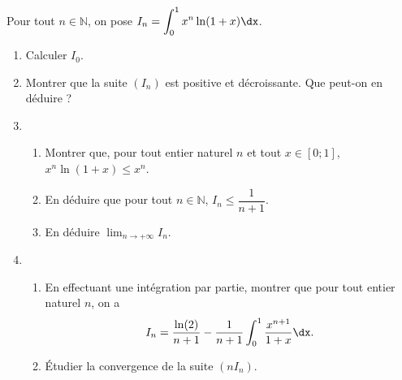 \documentclass[11pt,fleqn, openany]{book} %
\begin{document}
\begin{exercise}[topic=int04]Pour tout $n \in\mathbb{N}$, on pose $I_n=\displaystyle\int_0^1x^n \ln(1+x)\dx$.
\begin{enumerate}
\item Calculer $I_0$.
\item Montrer que la suite $(I_n)$ est positive et décroissante. Que peut-on en déduire ?
\item \begin{enumerate}
\item Montrer que, pour tout entier naturel $n$ et tout $x\in [0;1]$, $x^n \ln(1+x) \leqslant x^n$.
\item En déduire que pour tout $n \in \mathbb{N}$, $I_n \leqslant \dfrac{1}{n+1}$.
\item En déduire $\displaystyle\lim_{n \to+\infty}I_n$.
\end{enumerate}
\item \begin{enumerate}
\item En effectuant une intégration par partie, montrer que pour tout entier naturel $n$, on a
\[I_n = \dfrac{\ln(2)}{n+1}-\dfrac{1}{n+1}\int_0^1\dfrac{x^{n+1}}{1+x}\dx.\]
\item Étudier la convergence de la suite $(nI_n)$.
\end{enumerate}
\end{enumerate}\end{exercise}
\end{document}
